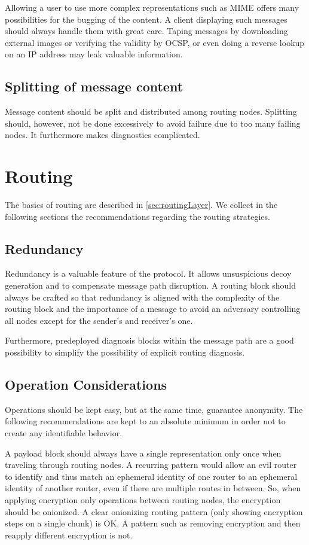 Allowing a user to use more complex representations such as MIME offers many possibilities for the bugging of the content. A client displaying such messages should always handle them with great care. Taping messages by downloading external images or verifying the validity by OCSP, or even doing a reverse lookup on an IP address may leak valuable information.

\subsection{Splitting of message content}
Message content should be split and distributed among routing nodes. Splitting should, however, not be done excessively to avoid failure due to too many failing nodes. It furthermore makes diagnostics complicated. 

\section{Routing}
The basics of routing are described in \cref{sec:routingLayer}. We collect in the following sections the recommendations regarding the routing strategies.

\subsection{Redundancy}
Redundancy is a valuable feature of the protocol. It allows unsuspicious decoy generation and to compensate message path disruption. A routing block should always be crafted so that redundancy is aligned with the complexity of the routing block and the importance of a message to avoid an adversary controlling all nodes except for the sender's and receiver's one.

Furthermore, predeployed diagnosis blocks within the message path are a good possibility to simplify the possibility of explicit routing diagnosis.

\subsection{Operation Considerations}
Operations should be kept easy, but at the same time, guarantee anonymity. The following recommendations are kept to an absolute minimum in order not to create any identifiable behavior.

A payload block should always have a single representation only once when traveling through routing nodes. A recurring pattern would allow an evil router to identify and thus match an ephemeral identity of one router to an ephemeral identity of another router, even if there are multiple routes in between. So, when applying encryption only operations between routing nodes, the encryption should be onionized. A clear onionizing routing pattern (only showing encryption steps on a single chunk) is OK. A pattern such as removing encryption and then reapply different encryption is not.

